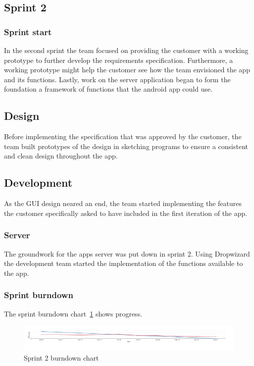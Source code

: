 \subsection{Sprint 2}

\subsubsection{Sprint start}
In the second sprint the team focused on providing the customer with a working
prototype to further develop the requirements specification. Furthermore, a
working prototype might help the customer see how the team envisioned the app
and its functions. Lastly, work on the server application began to form the
foundation a framework of functions that the android app could use.

\subsection{Design}
Before implementing the specification that was approved by the customer, the
team built prototypes of the design in sketching programs to ensure a consistent
and clean design throughout the app. 

\subsection{Development}
As the GUI design neared an end, the team started implementing the features the
customer specifically asked to have included in the first iteration of the app.

\subsubsection{Server}
The groundwork for the apps server was put down in sprint 2. Using Dropwizard
the development team started the implementation of the functions available to
the app.

\subsubsection{Sprint burndown}

The sprint burndown chart~\ref{fig:sprint2burndown} shows progress.

\begin{figure}[H]
\includegraphics[width=\textwidth]{ch/projectManagement/fig/sprint2burndown.png}
\caption{Sprint 2 burndown chart}
\label{fig:sprint2burndown}
\end{figure}


